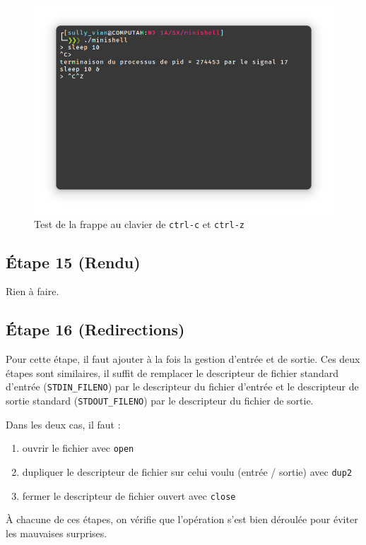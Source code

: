 \documentclass{article}
\begin{document}
\begin{figure}[H]
    \centering
    \includegraphics[width=\textwidth]{./resources/E14.png}
    \caption{Test de la frappe au clavier de \texttt{ctrl-c} et \texttt{ctrl-z}}
\end{figure}

\subsection*{Étape 15 (Rendu)}

Rien à faire.

\subsection*{Étape 16 (Redirections)}

Pour cette étape, il faut ajouter à la fois la gestion d'entrée et de sortie. Ces deux étapes sont similaires, il suffit de remplacer le descripteur de fichier standard d'entrée (\texttt{STDIN\_FILENO}) par le descripteur du fichier d'entrée et le descripteur de sortie standard (\texttt{STDOUT\_FILENO}) par le descripteur du fichier de sortie.

Dans les deux cas, il faut :
\begin{enumerate}
    \item ouvrir le fichier avec \texttt{open}
    \item dupliquer le descripteur de fichier sur celui voulu (entrée / sortie) avec \texttt{dup2}
    \item fermer le descripteur de fichier ouvert avec \texttt{close}
\end{enumerate}
À chacune de ces étapes, on vérifie que l'opération s'est bien déroulée pour éviter les mauvaises surprises.
\end{document}
